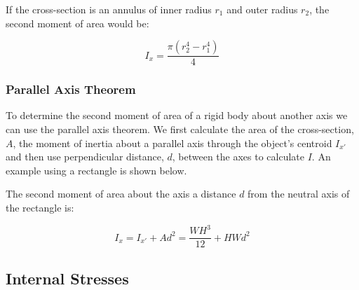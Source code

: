 \documentclass[12pt, letterpaper, twoside]{article}
\begin{document}
If the cross-section is an annulus of inner radius $r_1$ and outer radius $r_2$, the second moment of area would be:

\begin{equation}
I_x=\frac{\pi (r_2^4 - r_1^4)}{4}
\end{equation}


\subsubsection{Parallel Axis Theorem}

To determine the second moment of area of a rigid body about another axis we can use the parallel axis theorem.   We first calculate the area of the cross-section, $A$, the moment of inertia about a parallel axis through the object's centroid $I_{x'}$ and then use perpendicular distance, $d$, between the axes to calculate $I$. An example using a rectangle is shown below.

\begin{center}
\end{center}

The second moment of area about the axis a distance $d$ from the neutral axis of the rectangle is:

\begin{equation}
I_x= I_{x'} + Ad^2 = \frac{WH^3}{12} + HWd^2
\end{equation}


\subsection{Internal Stresses}
\end{document}

